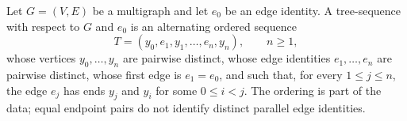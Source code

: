 \begin{definition}
Let $G=(V,E)$ be a multigraph and let $e_0$ be an edge identity.  A
tree-sequence with respect to $G$ and $e_0$ is an alternating ordered
sequence
\[
  T=(y_0,e_1,y_1,\ldots,e_n,y_n),\qquad n\geq 1,
\]
whose vertices $y_0,\ldots,y_n$ are pairwise distinct, whose edge identities
$e_1,\ldots,e_n$ are pairwise distinct, whose first edge is $e_1=e_0$, and
such that, for every $1\leq j\leq n$, the edge $e_j$ has ends $y_j$ and
$y_i$ for some $0\leq i<j$.  The ordering is part of the data; equal
endpoint pairs do not identify distinct parallel edge identities.
\end{definition}
